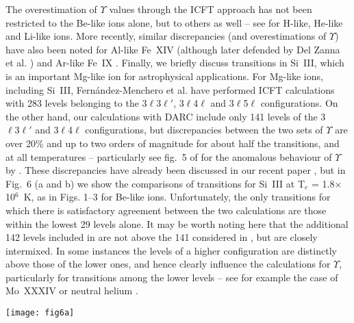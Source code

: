 \documentclass[fleqn]{article}
\begin{document}
The overestimation of $\Upsilon$ values through the ICFT approach has not been restricted to the Be-like ions alone, but to others as well -- see \cite{fst} for H-like, He-like and Li-like ions. More recently, similar discrepancies (and overestimations of $\Upsilon$) have also been noted for Al-like Fe~XIV \cite{fe14} (although later defended by Del Zanna et al. \cite{icft3}) and Ar-like Fe~IX \cite{tz}. Finally, we briefly discuss transitions in Si~III, which is an important Mg-like ion for astrophysical applications. For Mg-like ions, including Si~III,  Fern{\'a}ndez-Menchero et al.  \cite{nrmglike} have performed ICFT calculations with 283 levels belonging to the 3$\ell3\ell'$, 3$\ell$4$\ell$ and 3$\ell$5$\ell$ configurations. On the other hand, our calculations with DARC \cite{si3} include only 141 levels of the 3$\ell3\ell'$ and  3$\ell$4$\ell$ configurations, but discrepancies between the two sets of $\Upsilon$ are over 20\% and up to two orders of magnitude for about half the transitions, and at all temperatures --  particularly see  fig.~5 of \cite{si3} for the anomalous behaviour of $\Upsilon$ by \cite{nrmglike}. These discrepancies have already been discussed in our recent paper \cite{si3}, but in Fig.~6 (a and b) we show the comparisons of transitions for Si~III at T$_e$ = 1.8$\times$10$^6$~K, as in Figs. 1--3 for Be-like ions. Unfortunately, the only transitions for which there is satisfactory agreement between the two calculations are those within the lowest 29 levels alone. It may be worth noting here that the additional 142 levels included in \cite{nrmglike} are not above the 141 considered in \cite{si3}, but are closely intermixed. In some instances the levels of a higher configuration are distinctly above those of the lower ones, and hence clearly influence the calculations for $\Upsilon$, particularly for  transitions among the lower levels -- see for example the case of Mo~XXXIV \cite{mo34} or neutral helium \cite{bk}. 

\begin{figure*}
\texttt{[image: fig6a]}
 \vspace{-1.5cm}
 \end{figure*}
 
\end{document}

